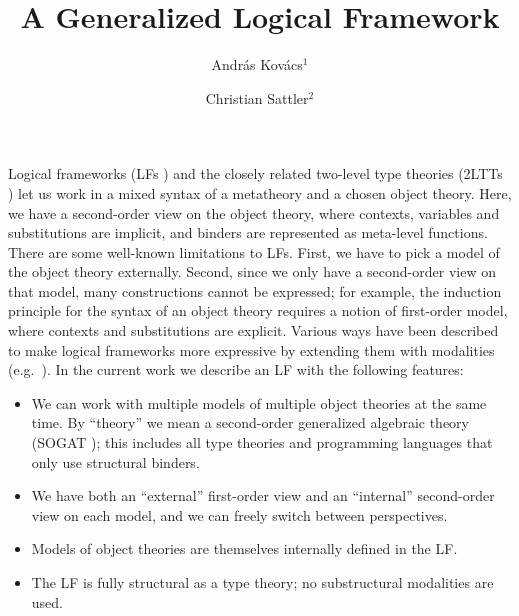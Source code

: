 \documentclass{easychair}
\title{A Generalized Logical Framework}
\author{Andr\'as Kov\'acs$^{1}$ \and Christian Sattler$^{2}$}
\institute{
  Chalmers University of Technology \& University of Gothenburg, Sweden \\
  $^{1}$\,\email{andrask@chalmers.se}\,\,\,$^{2}$\,\email{sattler@chalmers.se}
}
\begin{document}
\maketitle

Logical frameworks (LFs \cite{Harper93lf}) and the closely related two-level type
theories (2LTTs \cite{twolevel}) let us work in a mixed syntax of a metatheory and a
chosen object theory. Here, we have a second-order view on the object theory,
where contexts, variables and substitutions are implicit, and binders are
represented as meta-level functions. There are some well-known limitations to
LFs. First, we have to pick a model of the object theory externally. Second,
since we only have a second-order view on that model, many constructions cannot
be expressed; for example, the induction principle for the syntax of an object
theory requires a notion of first-order model, where contexts and substitutions
are explicit. Various ways have been described to make logical frameworks more
expressive by extending them with modalities (e.g.\ \cite{sterlingthesis,DBLP:conf/lics/Hofmann99,DBLP:journals/corr/abs-1901-03378,orton_et_al:LIPIcs:2016:6564}). In the current work we
describe an LF with the following features:
\begin{itemize}
\item We can work with multiple models of multiple object theories at the same
  time. By ``theory'' we mean a second-order generalized algebraic theory
  (SOGAT \cite{uemura,DBLP:conf/fscd/KaposiX24}); this includes all type theories and programming languages that
  only use structural binders.
\item We have both an ``external'' first-order view and an ``internal'' second-order view on each model,
      and we can freely switch between perspectives.
\item Models of object theories are themselves internally defined in the LF.
\item The LF is fully structural as a type theory; no substructural modalities
  are used.
\end{itemize}
\end{document}
